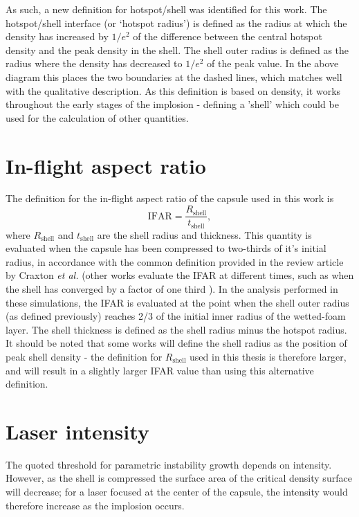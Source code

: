As such, a new definition for hotspot/shell was identified for this work. The hotspot/shell interface (or `hotspot radius') is defined as the radius at which the density has increased by $1/e^2$ of the difference between the central hotspot density and the peak density in the shell. The shell outer radius is defined as the radius where the density has decreased to $1/e^2$ of the peak value. In the above diagram this places the two boundaries at the dashed lines, which matches well with the qualitative description. As this definition is based on density, it works throughout the early stages of the implosion - defining a 'shell' which could be used for the calculation of other quantities. 

\section{In-flight aspect ratio}

The definition for the in-flight aspect ratio of the capsule used in this work is \begin{equation} \mathrm{IFAR} = \frac{R_\mathrm{shell}}{t_\mathrm{shell}}, \end{equation}
where $R_\mathrm{shell}$ and $t_\mathrm{shell}$ are the shell radius and thickness. This quantity is evaluated when the capsule has been compressed to two-thirds of it's initial radius, in accordance with the common definition provided in the review article by Craxton \textit{et al.} \cite{Craxton2015} (other works evaluate the IFAR at different times, such as when the shell has converged by a factor of one third \cite{Radha2011}). In the analysis performed in these simulations, the IFAR is evaluated at the point when the shell outer radius (as defined previously) reaches 2/3 of the initial inner radius of the wetted-foam layer. The shell thickness is defined as the shell radius minus the hotspot radius. It should be noted that some works will define the shell radius as the position of peak shell density - the definition for $R_\mathrm{shell}$ used in this thesis is therefore larger, and will result in a slightly larger IFAR value than using this alternative definition.

\section{Laser intensity}

The quoted threshold for parametric instability growth depends on intensity. However, as the shell is compressed the surface area of the critical density surface will decrease; for a laser focused at the center of the capsule, the intensity would therefore increase as the implosion occurs.

